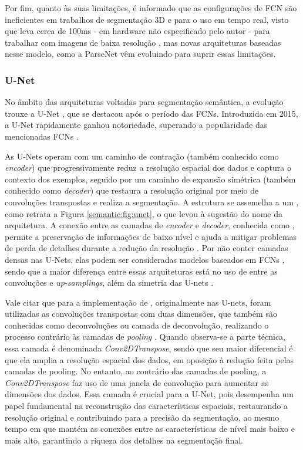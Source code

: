 Por fim, quanto às suas limitações, é informado que as configurações de FCN são ineficientes em trabalhos de segmentação 3D e para o uso em tempo real, visto que leva cerca de 100ms - em hardware não especificado pelo autor - para trabalhar com imagens de baixa resolução \citep{Minaee2021}, mas novas arquiteturas baseadas nesse modelo, como a ParseNet \citep{Liu2015} vêm evoluindo para suprir essas limitações.

\subsubsection{U-Net}
\label{semantic:unet}
No âmbito das arquiteturas voltadas para segmentação semântica, a evolução trouxe a U-Net \citep{Ronneberger2015U-net:Segmentation}, que se destacou após o período das FCNs. Introduzida em 2015, a U-Net rapidamente ganhou notoriedade, superando a popularidade das mencionadas FCNs \citep{Sultana2020EvolutionSurvey}.

As U-Nets operam com um caminho de contração (também conhecido como \textit{encoder}) que progressivamente reduz a resolução espacial dos dados e captura o contexto dos exemplos, seguido por um caminho de expansão simétrica (também conhecido como \textit{decoder}) que restaura a resolução original por meio de convoluções transpostas e realiza a segmentação. A estrutura se assemelha a um , como retrata a Figura \ref{semantic:fig:unet}, o que levou à sugestão do nome da arquitetura. A conexão entre as camadas de \textit{encoder} e \textit{decoder}, conhecida como , permite a preservação de informações de baixo nível e ajuda a mitigar problemas de perda de detalhes durante a redução da resolução \citep{Minaee2021, Minaee2021DeepClassification}. Por não conter camadas densas nas U-Nets, elas podem ser consideradas modelos baseados em FCNs \citep{Minaee2021}, sendo que a maior diferença entre essas arquiteturas está no uso de  entre as convoluções e \textit{up-samplings}, além da simetria das U-nets \citep{OZTURK2020ComparisonImageries}.

Vale citar que para a implementação de , originalmente nas U-nets, foram utilizadas as convoluções transpostas com duas dimensões, que também são conhecidas como deconvoluções ou camada de deconvolução, realizando o processo contrário às camadas de \textit{pooling} \citep{Zeiler2014Visualizing2013}. Quando observa-se a parte técnica, essa camada é denominada \textit{Conv2DTranspose}, sendo que seu maior diferencial é que  ela amplia a resolução espacial dos dados, em oposição à redução feita pelas camadas de pooling. No entanto, ao contrário das camadas de pooling, a \textit{Conv2DTranspose} faz uso de uma janela de convolução para aumentar as dimensões dos dados. Essa camada é crucial para a U-Net, pois desempenha um papel fundamental na reconstrução das características espaciais, restaurando a resolução original e contribuindo para a precisão da segmentação, ao mesmo tempo em que mantém as conexões entre as características de nível mais baixo e mais alto, garantindo a riqueza dos detalhes na segmentação final.

